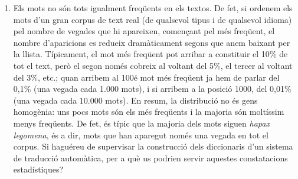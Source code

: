 \begin{enumerate}

\item Els mots no són tots igualment freqüents en els textos. De
  fet, si ordenem els mots d'un gran corpus de text real (de qualsevol
  tipus i de qualsevol idioma) pel nombre de vegades que hi apareixen,
  començant pel més freqüent, el nombre d'aparicions es redueix
  dramàticament segons que anem baixant per la llista. Típicament, el
  mot més freqüent pot arribar a constituir el 10\% de tot el text,
  però el segon només cobreix al voltant del 5\%, el tercer al voltant
  del 3\%, etc.; quan arribem al 100é mot més freqüent ja hem de
  parlar del 0,1\% (una vegada cada 1.000 mots), i si arribem a la
  posició 1000, del 0,01\% (una vegada cada 10.000 mots).  En resum,
  la distribució no és gens homogènia: uns pocs mots són els més
  freqüents i la majoria són moltíssim menys freqüents. De fet, és
  típic que la majoria dels mots siguen \emph{hapax legomena}, és a
  dir, mots que han aparegut només una vegada en tot el corpus. Si
  haguéreu de supervisar la construcció dels diccionaris d'un sistema
  de traducció automàtica, per a què us podrien servir aquestes
  constatacions estadístiques?


\end{enumerate}
